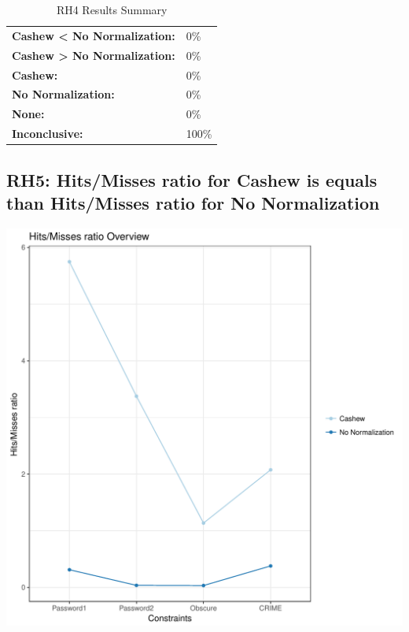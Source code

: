 \documentclass{article}\usepackage[]{graphicx}\usepackage[]{color}
\makeatletter
\def\maxwidth{ %
  \ifdim\Gin@nat@width>\linewidth
    \linewidth
  \else
    \Gin@nat@width
  \fi
}
\newenvironment{knitrout}{}{} %
\makeatother
\begin{document}
	\begin{table}[H]
	\centering
	\caption{RH4 Results Summary}
	\begin{tabular}{ll}
	\textbf{Cashew \textless{} No Normalization:}& 0\% \\
	\textbf{Cashew \textgreater{} No Normalization:}& 0\%\\
	\textbf{Cashew:} & 0\%\\
	\textbf{No Normalization:} & 0\%\\
	\textbf{None:}& 0\%\\
	\textbf{Inconclusive:}& 100\%
			
	
	\end{tabular}
	\end{table}
	
	
	



\subsection{RH5: Hits/Misses ratio for Cashew is equals than Hits/Misses ratio for No Normalization}


 
\begin{knitrout}
\color{fgcolor}
\includegraphics[width=\maxwidth]{figure/overview_RH5-1} 

\end{knitrout}
 	
\end{document}
